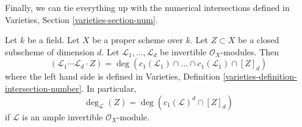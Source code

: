 \noindent
Finally, we can tie everything up with the numerical intersections
defined in Varieties, Section \ref{varieties-section-num}.

\begin{lemma}
\label{lemma-degrees-and-numerical-intersections}
Let $k$ be a field. Let $X$ be a proper scheme over $k$.
Let $Z \subset X$ be a closed subscheme of dimension $d$.
Let $\mathcal{L}_1, \ldots, \mathcal{L}_d$ be invertible
$\mathcal{O}_X$-modules. Then
$$
(\mathcal{L}_1 \cdots \mathcal{L}_d \cdot Z) =
\deg(
c_1(\mathcal{L}_1) \cap \ldots \cap c_1(\mathcal{L}_1) \cap [Z]_d)
$$
where the left hand side is defined in
Varieties, Definition \ref{varieties-definition-intersection-number}.
In particular,
$$
\deg_\mathcal{L}(Z) = \deg(c_1(\mathcal{L})^d \cap [Z]_d)
$$
if $\mathcal{L}$ is an ample invertible $\mathcal{O}_X$-module.
\end{lemma}

